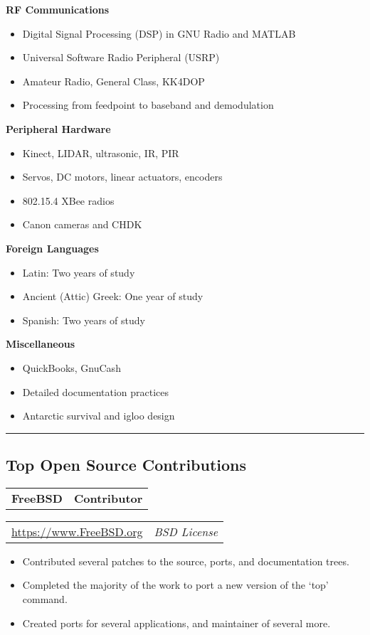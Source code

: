 \documentclass[10pt,letterpaper]{article}
\newcommand{\headerrow}[2]{%
    \begin{tabularx}{\linewidth}{Xr}
	    #1 & #2 \\
    \end{tabularx}
}
\begin{document}
    \textbf{RF Communications}
    \begin{itemize}[label=--]
        \item Digital Signal Processing (DSP) in GNU Radio and MATLAB
        \item Universal Software Radio Peripheral (USRP)
        \item Amateur Radio, General Class, KK4DOP
        \item Processing from feedpoint to baseband and demodulation
    \end{itemize}
    \textbf{Peripheral Hardware}
    \begin{itemize}[label=--]
        \item Kinect, LIDAR, ultrasonic, IR, PIR
        \item Servos, DC motors, linear actuators, encoders
        \item 802.15.4 XBee radios
        \item Canon cameras and CHDK
    \end{itemize}
    \textbf{Foreign Languages}
    \begin{itemize}[label=--]
        \item Latin: Two years of study
        \item Ancient (Attic) Greek: One year of study
        \item Spanish: Two years of study
    \end{itemize}
    \textbf{Miscellaneous}
    \begin{itemize}[label=--]
        \item QuickBooks, GnuCash
        \item Detailed documentation practices
        \item Antarctic survival and igloo design
    \end{itemize}

\vspace{2pt}
\hrule
\vspace{-0.4em}
\subsection*{Top Open Source Contributions}
    \headerrow{\textbf{FreeBSD}}{\textbf{Contributor}}
    \headerrow{\url{https://www.FreeBSD.org}}{\textit{BSD License}}
    \begin{itemize}[label=--]
        \item Contributed several patches to the source, ports, and
            documentation trees.

        \item Completed the majority of the work to port a new version of
            the `top' command.

        \item Created ports for several applications, and maintainer of
            several more.
    \end{itemize}
\end{document}
